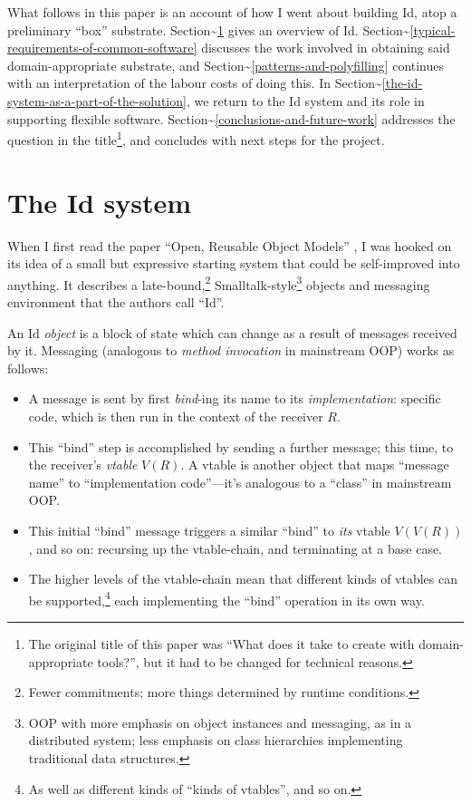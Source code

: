 What follows in this paper is an account of how I went about building
Id, atop a preliminary ``box'' substrate.
Section\textasciitilde{}\ref{the-id-system} gives an overview of Id.
Section\textasciitilde{}\ref{typical-requirements-of-common-software}
discusses the work involved in obtaining said domain-appropriate
substrate, and Section\textasciitilde{}\ref{patterns-and-polyfilling}
continues with an interpretation of the labour costs of doing this. In
Section\textasciitilde{}\ref{the-id-system-as-a-part-of-the-solution},
we return to the Id system and its role in supporting flexible software.
Section\textasciitilde{}\ref{conclusions-and-future-work} addresses the
question in the title\footnote{The original title of this paper was
  ``What does it take to create with domain-appropriate tools?'', but it
  had to be changed for technical reasons.}, and concludes with next
steps for the project.

\hypertarget{the-id-system}{%
\section{The Id system}\label{the-id-system}}

When I first read the paper ``Open, Reusable Object Models''
\cite{OROM}, I was hooked on its idea of a small but expressive starting
system that could be self-improved into anything. It describes a
late-bound,\footnote{Fewer commitments; more things determined by
  runtime conditions.} Smalltalk-style\footnote{OOP with more emphasis
  on object instances and messaging, as in a distributed system; less
  emphasis on class hierarchies implementing traditional data
  structures.} objects and messaging environment that the authors call
``Id''.

An Id{} \emph{object} is a block of state which can change as a result
of messages received by it. Messaging (analogous to \emph{method
invocation} in mainstream OOP) works as follows:

\begin{itemize}
\tightlist
\item
  A message is sent by first \emph{bind}-ing its name to its
  \emph{implementation}: specific code, which is then run in the context
  of the receiver \(R\).
\item
  This ``bind'' step is accomplished by sending a further message; this
  time, to the receiver's \emph{vtable} \(V(R)\). A vtable is another
  object that maps ``message name'' to ``implementation code''---it's
  analogous to a ``class'' in mainstream OOP.
\item
  This initial ``bind'' message triggers a similar ``bind'' to
  \emph{its} vtable \(V(V(R))\), and so on: recursing up the
  vtable-chain, and terminating at a base case.
\item
  The higher levels of the vtable-chain mean that different kinds of
  vtables can be supported,\footnote{As well as different kinds of
    ``kinds of vtables'', and so on.} each implementing the ``bind''
  operation in its own way.
\end{itemize}

